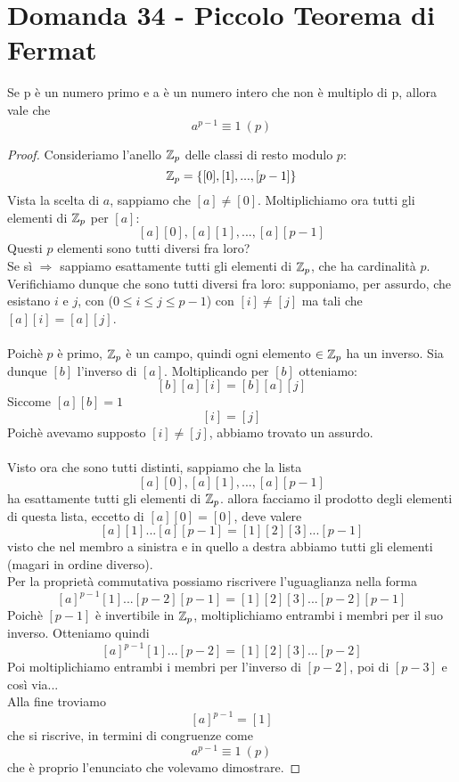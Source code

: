 \documentclass[]{article}
\begin{document}
\section{Domanda 34 - Piccolo Teorema di Fermat}
\begin{lem}
Se p è un numero primo e a è un numero intero che non è multiplo di p, allora vale che $$a^{p-1} \equiv 1\ (p)$$
\end{lem}
\begin{proof}
Consideriamo l'anello $\mathbb{Z}_p$ delle classi di resto modulo $p$: $$\mathbb{Z}_p = \{[0], [1], ..., [p-1]\}$$ Vista la scelta di $a$, sappiamo che $[a] \not= [0]$. Moltiplichiamo ora tutti gli elementi di $\mathbb{Z}_p$ per $[a]$: $$[a][0], [a][1], ..., [a][p-1]$$ Questi $p$ elementi sono tutti diversi fra loro? \\
Se sì $\Rightarrow$ sappiamo esattamente tutti gli elementi di $\mathbb{Z}_p$, che ha cardinalità $p$.\\
Verifichiamo dunque che sono tutti diversi fra loro: supponiamo, per assurdo, che esistano $i$ e $j$, con ($0 \le i \le j \le p-1$) con $[i] \not=[j]$ ma tali che $[a][i] = [a][j]$.\\ \\ Poichè $p$ è primo, $\mathbb{Z}_p$ è un campo, quindi ogni elemento $\in \mathbb{Z}_p$ ha un inverso. Sia dunque $[b]$ l'inverso di $[a]$. Moltiplicando per $[b]$ otteniamo: $$[b][a][i] = [b][a][j]$$ Siccome $[a][b]=1$ $$[i] = [j]$$Poichè avevamo supposto $[i] \not= [j]$, abbiamo trovato un assurdo.\\
\\
Visto ora che sono tutti distinti, sappiamo che la lista $$[a][0], [a][1], ..., [a][p-1]$$ ha esattamente tutti gli elementi di $\mathbb{Z}_p$. allora facciamo il prodotto degli elementi di questa lista, eccetto di $[a][0] = [0]$, deve valere $$[a][1] ...  [a][p-1] = [1][2][3]...[p-1]$$ visto che nel membro a sinistra e in quello a destra abbiamo tutti gli elementi (magari in ordine diverso). \\Per la proprietà commutativa possiamo riscrivere l'uguaglianza nella forma $$[a]^{p-1}[1] ...[p-2][p-1] = [1][2][3]...[p-2][p-1]$$ Poichè $[p-1]$ è invertibile in $\mathbb{Z}_p$, moltiplichiamo entrambi i membri per il suo inverso. Otteniamo quindi $$[a]^{p-1}[1] ... [p-2] = [1][2][3] ... [p-2]$$ Poi moltiplichiamo entrambi i membri per l'inverso di $[p-2]$, poi di $[p-3]$ e così via...\\
Alla fine troviamo $$[a]^{p-1} = [1]$$ che si riscrive, in termini di congruenze come $$a^{p-1} \equiv 1\ (p)$$ che è proprio l'enunciato che volevamo dimostrare.
\end{proof}
\end{document}
